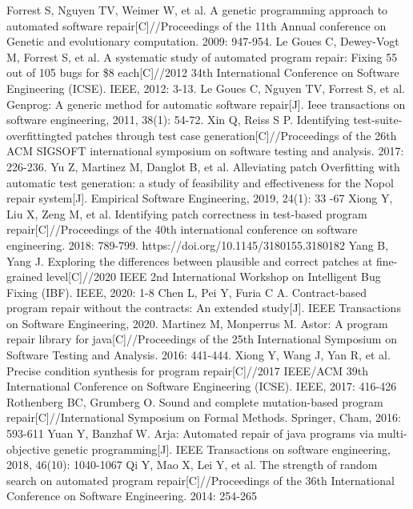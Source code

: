 \begin{thebibliography}{}
Forrest S, Nguyen TV, Weimer W, et al. A genetic programming approach to automated software repair[C]//Proceedings of the 11th Annual conference on Genetic and evolutionary computation. 2009: 947-954.
	Le Goues C, Dewey-Vogt M, Forrest S, et al. A systematic study of automated program repair: Fixing 55 out of 105 bugs for \$8 each[C]//2012 34th International Conference on Software Engineering (ICSE). IEEE, 2012: 3-13.
Le Goues C, Nguyen TV, Forrest S, et al. Genprog: A generic method for automatic software repair[J]. Ieee transactions on software engineering, 2011, 38(1): 54-72.
Xin Q, Reiss S P. Identifying test-suite-overfittingted patches through test case generation[C]//Proceedings of the 26th ACM SIGSOFT international symposium on software testing and analysis. 2017: 226-236.
Yu Z, Martinez M, Danglot B, et al. Alleviating patch Overfitting with automatic test generation: a study of feasibility and effectiveness for the Nopol repair system[J]. Empirical Software Engineering, 2019, 24(1): 33 -67
Xiong Y, Liu X, Zeng M, et al. Identifying patch correctness in test-based program repair[C]//Proceedings of the 40th international conference on software engineering. 2018: 789-799. 
https://doi.org/10.1145/3180155.3180182
Yang B, Yang J. Exploring the differences between plausible and correct patches at fine-grained level[C]//2020 IEEE 2nd International Workshop on Intelligent Bug Fixing (IBF). IEEE, 2020: 1-8
Chen L, Pei Y, Furia C A. Contract-based program repair without the contracts: An extended study[J]. IEEE Transactions on Software Engineering, 2020.
Martinez M, Monperrus M. Astor: A program repair library for java[C]//Proceedings of the 25th International Symposium on Software Testing and Analysis. 2016: 441-444.
Xiong Y, Wang J, Yan R, et al. Precise condition synthesis for program repair[C]//2017 IEEE/ACM 39th International Conference on Software Engineering (ICSE). IEEE, 2017: 416-426
Rothenberg BC, Grumberg O. Sound and complete mutation-based program repair[C]//International Symposium on Formal Methods. Springer, Cham, 2016: 593-611
Yuan Y, Banzhaf W. Arja: Automated repair of java programs via multi-objective genetic programming[J]. IEEE Transactions on software engineering, 2018, 46(10): 1040-1067
Qi Y, Mao X, Lei Y, et al. The strength of random search on automated program repair[C]//Proceedings of the 36th International Conference on Software Engineering. 2014: 254-265

\end{thebibliography}

